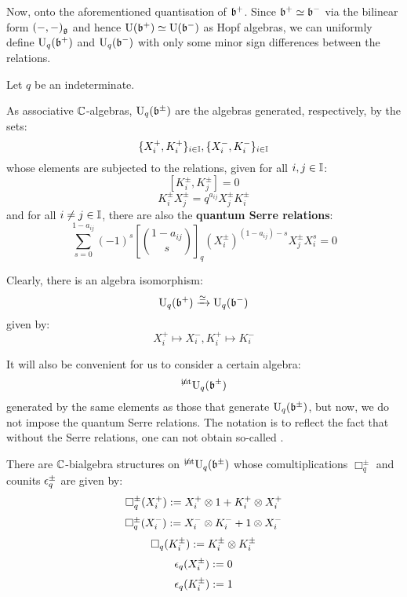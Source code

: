         Now, onto the aforementioned quantisation of $\mathfrak{b}^+$. Since $\mathfrak{b}^+ \simeq \mathfrak{b}^-$ via the bilinear form $(-, -)_{\mathfrak{g}}$ and hence $\mathrm{U}(\mathfrak{b}^+) \simeq \mathrm{U}(\mathfrak{b}^-)$ as Hopf algebras, we can uniformly define $\mathrm{U}_q(\mathfrak{b}^+)$ and $\mathrm{U}_q(\mathfrak{b}^-)$ with only some minor sign differences between the relations. 
        \begin{definition} \label{def: quantum_borel_subalgebras}
            Let $q$ be an indeterminate.
        
            As associative $\mathbb{C}$-algebras, $\mathrm{U}_q(\mathfrak{b}^{\pm})$ are the algebras generated, respectively, by the sets:
                $$\{ X_i^+, K_i^+ \}_{i \in \mathbb{I}}, \{ X_i^-, K_i^- \}_{i \in \mathbb{I}}$$
            whose elements are subjected to the relations, given for all $i, j \in \mathbb{I}$:
                $$[K_i^{\pm}, K_j^{\pm}] = 0$$
                $$K_i^{\pm} X_j^{\pm} = q^{a_{ij}} X_j^{\pm} K_i^{\pm}$$
            and for all $i \not = j \in \mathbb{I}$, there are also the \textbf{quantum Serre relations}:
                $$\sum_{s = 0}^{1 - a_{ij}} (-1)^s \left[\binom{1 - a_{ij}}{s}\right]_q (X_i^{\pm})^{(1 - a_{ij}) - s} X_j^{\pm} X_i^s = 0$$
        \end{definition}
        Clearly, there is an algebra isomorphism:
            $$\mathrm{U}_q(\mathfrak{b}^+) \xrightarrow[]{\simeq} \mathrm{U}_q(\mathfrak{b}^-)$$
        given by:
            $$X_i^+ \mapsto X_i^-, K_i^+ \mapsto K_i^-$$
        \begin{convention}
            It will also be convenient for us to consider a certain algebra:
                $${}^{\not \mathrm{int}}\mathrm{U}_q(\mathfrak{b}^{\pm})$$
            generated by the same elements as those that generate $\mathrm{U}_q(\mathfrak{b}^{\pm})$, but now, we do not impose the quantum Serre relations. The notation is to reflect the fact that without the Serre relations, one can not obtain so-called .
        \end{convention}
        \begin{lemma} \label{lemma: bialgebra_strructures_on_non_integrable_quantum_borel_subalgebras}
            There are $\mathbb{C}$-bialgebra structures on ${}^{\not \mathrm{int}}\mathrm{U}_q(\mathfrak{b}^{\pm})$ whose comultiplications $\Box_q^{\pm}$ and counits $\epsilon_q^{\pm}$ are given by:
                $$\Box_q^{\pm}(X_i^+) := X_i^+ \tensor 1 + K_i^+ \tensor X_i^+$$
                $$\Box_q^{\pm}(X_i^-) := X_i^- \tensor K_i^- + 1 \tensor X_i^-$$
                $$\Box_q(K_i^{\pm}) := K_i^{\pm} \tensor K_i^{\pm}$$
                $$\epsilon_q(X_i^{\pm}) := 0$$
                $$\epsilon_q(K_i^{\pm}) := 1$$
        \end{lemma}
